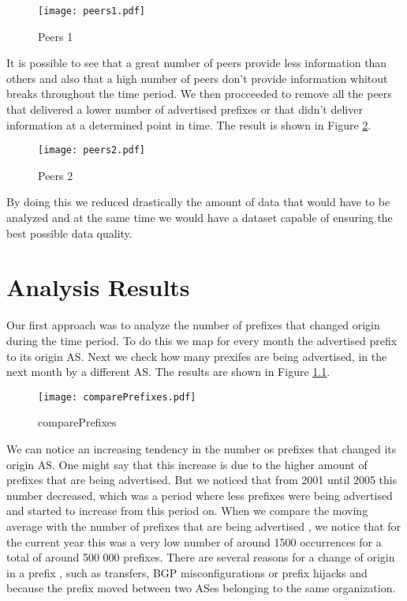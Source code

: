 \documentclass[11pt,a4paper]{scrreprt}
\begin{document}
\begin{figure}[h!]
\centering
\texttt{[image: peers1.pdf]}
\caption{Peers 1}
\label{fig:peers1}
\end{figure}

It is possible to see that a great number of peers provide less information than others and also that a high number of peers don't provide information whitout breaks throughout the time period. We then procceeded to remove all the peers that delivered a lower number of advertised prefixes or that didn't deliver information at a determined point in time. The result is shown in Figure \ref{fig:peers2}.  

\begin{figure}[ht!]
\centering
\texttt{[image: peers2.pdf]}
\caption{Peers 2}
\label{fig:peers2}
\end{figure}

By doing this we reduced drastically the amount of data that would have to be analyzed and at the same time we would have a dataset capable of ensuring the best possible data quality. 

\chapter{Analysis  Results}

Our first approach was to analyze the number of prefixes that changed origin during the time period. To do this we map for every month the advertised prefix to its origin AS. Next we check how many prexifes are being advertised, in the next month by a different AS. The results are shown in Figure \ref{fig:comparePrefixes}.

\begin{figure}[ht!]
\centering
\texttt{[image: comparePrefixes.pdf]}
\caption{comparePrefixes}
\label{fig:comparePrefixes}
\end{figure}

We can notice an increasing tendency in the number os prefixes that changed its origin AS. One might say that this increase is due to the higher amount of prefixes that are being advertised. But we noticed that from 2001 until 2005 this number decreased, which was a period where less prefixes were being advertised and started to increase from this period on. When we compare the moving average with the number of prefixes that are being advertised \cite{Potaroo}, we notice that for the current year this was a very low number of around 1500 occurrences for a total of around 500 000 prefixes. There are several reasons for a change of origin in a prefix \cite{IPv4_Transfer_Markets}, such as transfers, BGP misconfigurations or prefix hijacks and because the prefix moved between two ASes belonging to the same organization.     
\end{document}
